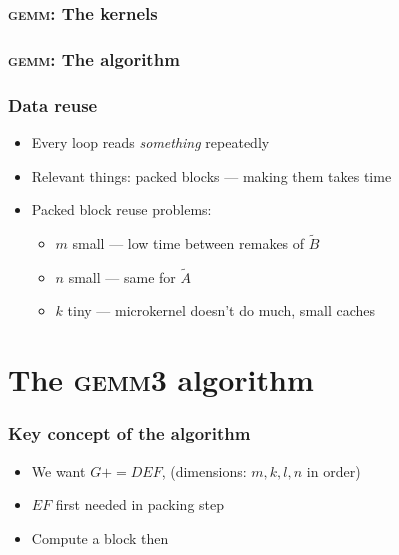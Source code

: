 \documentclass{beamer}
\newcommand*{\pluseq}{\mathrel{{+}{=}}}
\newcommand*{\gemmt}{{\textsc{gemm3}}}
\newcommand*{\gemm}{{\textsc{gemm}}}
\begin{document}
\begin{frame}
  \frametitle{\gemm{}: The kernels}
  \begin{adjustbox}{max size={!}{0.87\textheight},center}
  \end{adjustbox}
\end{frame}

\begin{frame}
  \frametitle{\gemm{}: The algorithm}
  \begin{adjustbox}{max size={!}{0.87\textheight},center}
  \begin{tikzpicture}
    
  \end{tikzpicture}
  \end{adjustbox}
\end{frame}


\begin{frame}
  \frametitle{Data reuse}
  \begin{itemize}
  \item Every loop reads \emph{something} repeatedly
  \item Relevant things: packed blocks --- making them takes time
  \item Packed block reuse problems:
    \begin{itemize}
    \item $m$ small --- low time between remakes of $\widetilde{B}$
    \item $n$ small --- same for $\widetilde{A}$
    \item $k$ tiny --- microkernel doesn't do much, small caches
    \end{itemize}
  \end{itemize}
\end{frame}

\section[\gemmt{}]{The \gemmt{} algorithm}
\frame{\sectionpage}

\begin{frame}
  \frametitle{Key concept of the algorithm}
  \begin{itemize}
  \item We want $G \pluseq DEF$, (dimensions: $m, k, l, n$ in order)
  \item $EF$ first needed in packing step
  \item Compute a block then
  \end{itemize}
\end{frame}
\end{document}
